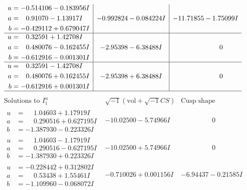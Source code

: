 \documentclass[1p]{elsarticle_modified}
\theoremstyle{definition}
\newcommand{\I}{\sqrt{-1}}
\begin{document}
$$\begin{array}{c|c|c}
\begin{aligned}
u &= -0.514106 - 0.183956 I \\
a &= \phantom{-}0.91070 - 1.13917 I \\
b &= -0.429112 + 0.679047 I\end{aligned}
 & -0.992824 - 0.084224 I & -11.71855 - 1.75099 I \\ \hline\begin{aligned}
u &= \phantom{-}0.32591 + 1.42708 I \\
a &= \phantom{-}0.480076 - 0.162455 I \\
b &= -0.612916 - 0.001301 I\end{aligned}
 & -2.95398 - 6.38488 I & \phantom{-0.000000 } 0 \\ \hline\begin{aligned}
u &= \phantom{-}0.32591 - 1.42708 I \\
a &= \phantom{-}0.480076 + 0.162455 I \\
b &= -0.612916 + 0.001301 I\end{aligned}
 & -2.95398 + 6.38488 I & \phantom{-0.000000 } 0\\
 \hline 
 \end{array}$$\newpage$$\begin{array}{c|c|c}  
\text{Solutions to }I^u_{1}& \I (\text{vol} + \sqrt{-1}CS) & \text{Cusp shape}\\
 \hline 
\begin{aligned}
u &= \phantom{-}1.04603 + 1.17919 I \\
a &= \phantom{-}0.290516 + 0.627195 I \\
b &= -1.387930 - 0.223326 I\end{aligned}
 & -10.02500 - 5.74966 I & \phantom{-0.000000 } 0 \\ \hline\begin{aligned}
u &= \phantom{-}1.04603 - 1.17919 I \\
a &= \phantom{-}0.290516 - 0.627195 I \\
b &= -1.387930 + 0.223326 I\end{aligned}
 & -10.02500 + 5.74966 I & \phantom{-0.000000 } 0 \\ \hline\begin{aligned}
u &= -0.228442 + 0.312802 I \\
a &= \phantom{-}0.53438 + 1.55461 I \\
b &= -1.109960 - 0.068072 I\end{aligned}
 & -0.710026 + 0.001156 I & -6.94437 - 0.21585 I \\ \hline\begin{aligned}

\end{aligned}
\end{array}$$
\end{document}
